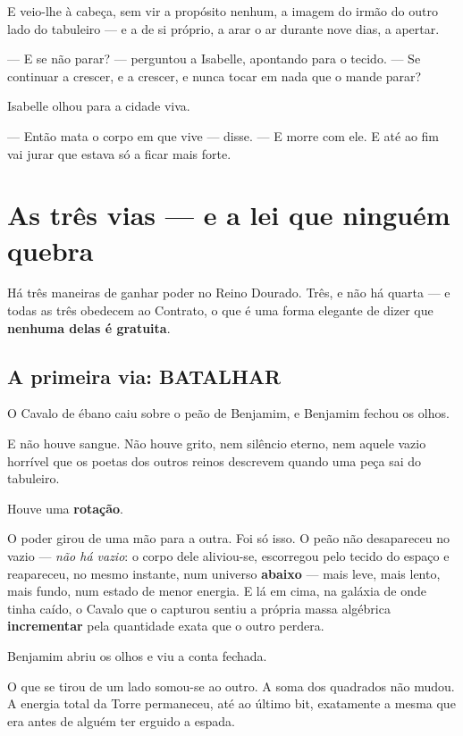 \documentclass[livro.tex]{subfiles}
\begin{document}
E veio-lhe à cabeça, sem vir a propósito nenhum, a imagem do irmão do outro lado do tabuleiro --- e a de si próprio,
a arar o ar durante nove dias, a apertar.

\medskip

--- E se não parar? --- perguntou a Isabelle, apontando para o tecido. --- Se continuar a crescer, e a crescer, e
nunca tocar em nada que o mande parar?

Isabelle olhou para a cidade viva.

--- Então mata o corpo em que vive --- disse. --- E morre com ele. E até ao fim vai jurar que estava só a ficar
mais forte.


\chapter{As três vias --- e a lei que ninguém quebra}

Há três maneiras de ganhar poder no Reino Dourado. Três, e não há quarta --- e todas as três obedecem ao Contrato,
o que é uma forma elegante de dizer que \textbf{nenhuma delas é gratuita}.

\section*{A primeira via: BATALHAR}

O Cavalo de ébano caiu sobre o peão de Benjamim, e Benjamim fechou os olhos.

E não houve sangue. Não houve grito, nem silêncio eterno, nem aquele vazio horrível que os poetas dos outros reinos
descrevem quando uma peça sai do tabuleiro.

Houve uma \textbf{rotação}.

O poder girou de uma mão para a outra. Foi só isso. O peão não desapareceu no vazio --- \emph{não há vazio}: o corpo
dele aliviou-se, escorregou pelo tecido do espaço e reapareceu, no mesmo instante, num universo \textbf{abaixo} --- mais
leve, mais lento, mais fundo, num estado de menor energia. E lá em cima, na galáxia de onde tinha caído, o Cavalo
que o capturou sentiu a própria massa algébrica \textbf{incrementar} pela quantidade exata que o outro perdera.

Benjamim abriu os olhos e viu a conta fechada.

O que se tirou de um lado somou-se ao outro. A soma dos quadrados não mudou. A energia total da Torre permaneceu,
até ao último bit, exatamente a mesma que era antes de alguém ter erguido a espada.
\end{document}
